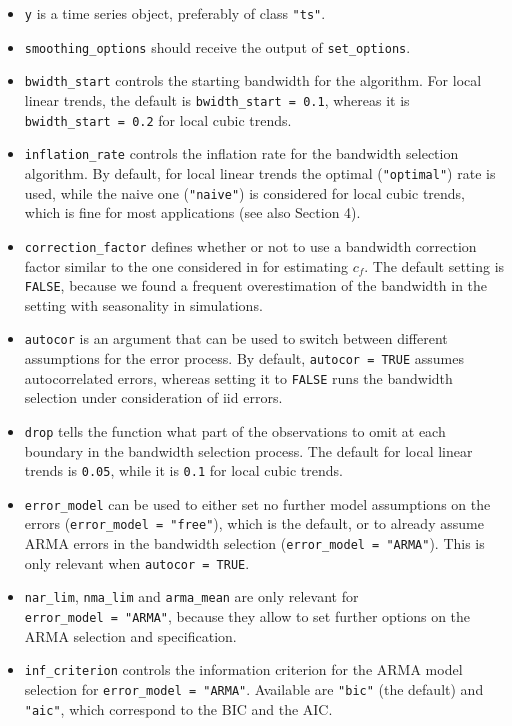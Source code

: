 \begin{itemize}
\tightlist
\item
  \texttt{y} is a time series object, preferably of class \texttt{"ts"}.
\item
  \texttt{smoothing\_options} should receive the output of \texttt{set\_options}.
\item
  \texttt{bwidth\_start} controls the starting bandwidth for the algorithm. For local linear trends, the default is \texttt{bwidth\_start\ =\ 0.1}, whereas it is \texttt{bwidth\_start\ =\ 0.2} for local cubic trends.
\item
  \texttt{inflation\_rate} controls the inflation rate for the bandwidth selection algorithm. By default, for local linear trends the optimal (\texttt{"optimal"}) rate is used, while the naive one (\texttt{"naive"}) is considered for local cubic trends, which is fine for most applications (see also Section 4).
\item
  \texttt{correction\_factor} defines whether or not to use a bandwidth correction factor similar to the one considered in \citet{feng2020datadriven} for estimating \(c_f\). The default setting is \texttt{FALSE}, because we found a frequent overestimation of the bandwidth in the setting with seasonality in simulations.
\item
  \texttt{autocor} is an argument that can be used to switch between different assumptions for the error process. By default, \texttt{autocor\ =\ TRUE} assumes autocorrelated errors, whereas setting it to \texttt{FALSE} runs the bandwidth selection under consideration of iid errors.
\item
  \texttt{drop} tells the function what part of the observations to omit at each boundary in the bandwidth selection process. The default for local linear trends is \texttt{0.05}, while it is \texttt{0.1} for local cubic trends.
\item
  \texttt{error\_model} can be used to either set no further model assumptions on the errors (\texttt{error\_model\ =\ "free"}), which is the default, or to already assume ARMA errors in the bandwidth selection (\texttt{error\_model\ =\ "ARMA"}). This is only relevant when \texttt{autocor\ =\ TRUE}.
\item
  \texttt{nar\_lim}, \texttt{nma\_lim} and \texttt{arma\_mean} are only relevant for \texttt{error\_model\ =\ "ARMA"}, because they allow to set further options on the ARMA selection and specification.
\item
  \texttt{inf\_criterion} controls the information criterion for the ARMA model selection for \texttt{error\_model\ =\ "ARMA"}. Available are \texttt{"bic"} (the default) and \texttt{"aic"}, which correspond to the BIC and the AIC.
\end{itemize}

